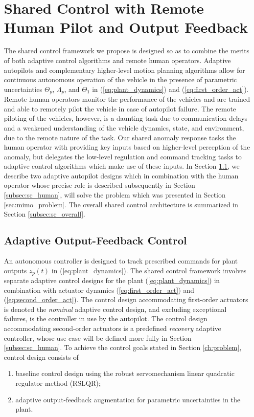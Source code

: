 \chapter{Shared Control with Remote Human Pilot and Output Feedback}  \label{ch:mimo_shared_ctrl}
The shared control framework we propose is designed so as to combine the merits of both adaptive control algorithms and remote human operators. Adaptive autopilots and complementary higher-level motion planning algorithms allow for continuous autonomous operation of the vehicle in the presence of parametric uncertainties $\Theta_p$, $\Lambda_p$, and $\Theta_1$ in (\ref{eq:plant_dynamics}) and (\ref{eq:first_order_act}). Remote human operators monitor the performance of the vehicles and are trained and able to remotely pilot the vehicle in case of autopilot failure. The remote piloting of the vehicles, however, is a daunting task due to communication delays and a weakened understanding of the vehicle dynamics, state, and environment, due to the remote nature of the task. Our shared anomaly response tasks the human operator with providing key inputs based on higher-level perception of the anomaly, but delegates the low-level regulation and command tracking tasks to adaptive control algorithms which make use of these inputs. In Section \ref{subsec:sc_adaptive}, we describe two adaptive autopilot designs which in combination with the human operator whose precise role is described subsequently in Section \ref{subsec:sc_human}, will solve the problem which was presented in Section \ref{sec:mimo_problem}. The overall shared control architecture is summarized in Section \ref{subsec:sc_overall}.

\section{Adaptive Output-Feedback Control}\label{subsec:sc_adaptive}
An autonomous controller is designed to track prescribed commands for plant outputs $z_p(t)$ in (\ref{eq:plant_dynamics}). The shared control framework involves separate adaptive control designs for the plant (\ref{eq:plant_dynamics}) in combination with actuator dynamics (\ref{eq:first_order_act}) and (\ref{eq:second_order_act}). The control design accommodating first-order actuators is denoted the \textit{nominal} adaptive control design, and excluding exceptional failures, is the controller in use by the autopilot. The control design accommodating second-order actuators is a predefined \textit{recovery} adaptive controller, whose use case will be defined more fully in Section \ref{subsec:sc_human}. To achieve the control goals stated in Section \ref{ch:problem}, control design consists of
\begin{enumerate}[label=(\roman*)]
	\item baseline control design using the robust servomechanism linear quadratic regulator method (RSLQR);
	\item adaptive output-feedback augmentation for parametric uncertainties in the plant.
\end{enumerate}

